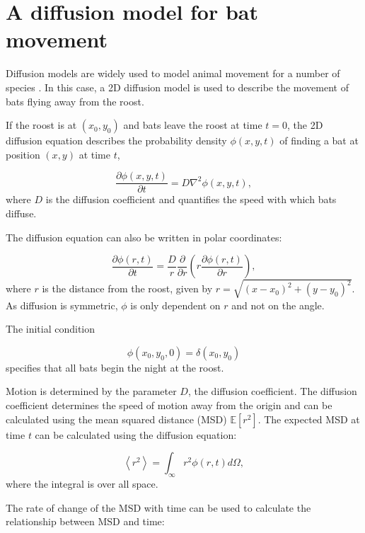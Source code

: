 \documentclass{article}
\newcommand{\D}[2]{\frac{\partial #1}{\partial #2}}
\begin{document}
\section{A diffusion model for bat movement}

Diffusion models are widely used to model animal movement for a number of species \cite{Ovaskainen2016}. In this case, a 2D diffusion model is used to describe the movement of bats flying away from the roost.

If the roost is at $(x_0,y_0)$ and bats leave the roost at time $t =0$,
the 2D diffusion equation describes the probability density $\phi(x,y,t)$ of
finding a bat at position $(x,y)$ at time $t$,

\begin{equation}
  \D{\phi(x,y,t)}{ t} = D \nabla^2 \phi(x,y,t) ,
  \nonumber
\end{equation}
%
where $D$ is the diffusion coefficient and quantifies the speed with which bats diffuse.

The diffusion equation can also be written in polar coordinates:

\begin{equation}
\D{ \phi(r,t)}{t} = \frac{D}{r} \D{}{ r} \left( r \D{\phi(r,t)}{r} \right),
\end{equation}
%
where $r$ is the distance from the roost, given by $r=\sqrt{(x-x_0)^2 + (y-y_0)^2}$. As diffusion is symmetric, $\phi$ is only dependent on $r$ and not on the angle.

The initial condition

\begin{equation}
\phi(x_0,y_0,0) = \delta(x_0,y_0)
\label{eqn:IC}
\end{equation}
%
specifies that all bats begin the night at the roost.

Motion is determined by the parameter $D$, the diffusion coefficient. The diffusion coefficient determines the speed of motion away from the origin and can be calculated using the mean squared distance (MSD) $\mathbb{E}[r^2]$. The expected MSD at time $t$ can be calculated using the diffusion equation:

\begin{equation}
\left<r^2\right> = \int_{\infty}r^2 \phi(r,t) d\Omega ,
\end{equation}
%
where the integral is over all space. 

The rate of change of the MSD with time can be used to calculate the relationship between MSD and time:
\end{document}

